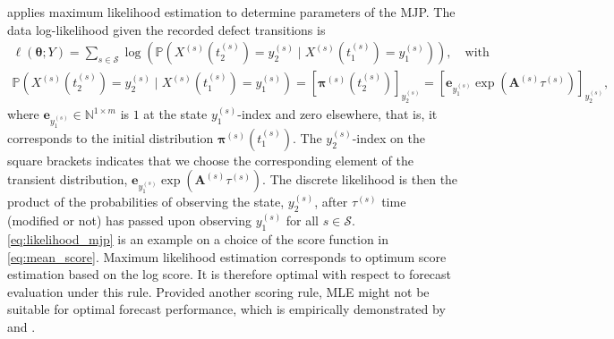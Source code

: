 \citet{bisgaard2024A} applies maximum likelihood estimation to determine parameters of the MJP.
The data log-likelihood given the recorded defect transitions is 
\begin{equation}
\begin{aligned}
                  \ell\left( \bm{\theta}; Y \right) = 
                  \sum_{s \in \mathcal{S}} \log \left( \mathds{P}\left(X^{(s)}(t_2^{(s)}) = y_2^{(s)} \mid X^{(s)}(t_1^{(s)}) = y_1^{(s)} \right) \right), \quad \text{with} \\ 
                 \mathds{P}\left(X^{(s)}(t_2^{(s)}) = y_2^{(s)} \mid X^{(s)}(t_1^{(s)}) = y_1^{(s)} \right) = \left[ \bm{\pi}^{(s)}\left( t_2^{(s)} \right)  \right]_{ y_2^{(s)}} =  \left[ \bm{e}_{y_{1}^{(s)}}  \exp \left( \bm{A}^{(s)} \tau^{(s)} \right) \right]_{ y_2^{(s)}},
                  \label{eq:likelihood_mjp}
\end{aligned}     
\end{equation}
where $\bm{e}_{y_{1}^{(s)}} \in \mathbb{N}^{1 \times m}$ is $1$ at the state $y_{1}^{(s)}$-index and zero elsewhere, that is, it corresponds to the initial distribution $\bm{\pi}^{(s)}(t_1^{(s)})$. The $y_2^{(s)}$-index on the square brackets indicates that we choose the corresponding element of the transient distribution, $\bm{e}_{y_{1}^{(s)}}  \exp \left( \bm{A}^{(s)} \tau^{(s)} \right)$. 
The discrete likelihood is then the product of the probabilities of observing the state, $y_2^{(s)}$, after $\tau^{(s)}$ time (modified or not) has passed upon observing $y_1^{(s)}$ for all $s \in \mathcal{S}$.
\cref{eq:likelihood_mjp} is an example on a choice of the score function in \cref{eq:mean_score}.
Maximum likelihood estimation corresponds to optimum score estimation based on the log score. It is therefore optimal with respect to forecast evaluation under this rule. Provided another scoring rule, MLE might not be suitable for optimal forecast performance, which is empirically demonstrated by \citet{Gneiting2005} and \citet{gebetsberger2018a}.
